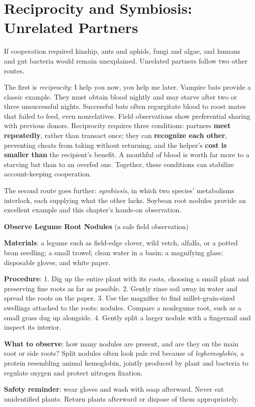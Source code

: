 \section{Reciprocity and Symbiosis: Unrelated Partners}

If cooperation required kinship, ants and aphids, fungi and algae, and humans and gut bacteria would remain unexplained. Unrelated partners follow two other routes.

The first is \emph{reciprocity}: I help you now, you help me later. Vampire bats provide a classic example. They must obtain blood nightly and may starve after two or three unsuccessful nights. Successful bats often regurgitate blood to roost mates that failed to feed, even nonrelatives. Field observations show preferential sharing with previous donors. Reciprocity requires three conditions: partners \textbf{meet repeatedly}, rather than transact once; they can \textbf{recognize each other}, preventing cheats from taking without returning; and the helper's \textbf{cost is smaller than} the recipient's benefit. A mouthful of blood is worth far more to a starving bat than to an overfed one. Together, these conditions can stabilize account-keeping cooperation.

The second route goes further: \emph{symbiosis}, in which two species' metabolisms interlock, each supplying what the other lacks. Soybean root nodules provide an excellent example and this chapter's hands-on observation.

\begin{shiyan}
\textbf{Observe Legume Root Nodules} (a safe field observation)

\textbf{Materials}: a legume such as field-edge clover, wild vetch, alfalfa, or a potted bean seedling; a small trowel; clean water in a basin; a magnifying glass; disposable gloves; and white paper.

\textbf{Procedure}: 1. Dig up the entire plant with its roots, choosing a small plant and preserving fine roots as far as possible. 2. Gently rinse soil away in water and spread the roots on the paper. 3. Use the magnifier to find millet-grain-sized swellings attached to the roots: nodules. Compare a nonlegume root, such as a small grass dug up alongside. 4. Gently split a larger nodule with a fingernail and inspect its interior.

\textbf{What to observe}: how many nodules are present, and are they on the main root or side roots? Split nodules often look pale red because of \emph{leghemoglobin}, a protein resembling animal hemoglobin, jointly produced by plant and bacteria to regulate oxygen and protect nitrogen fixation.

\textbf{Safety reminder}: wear gloves and wash with soap afterward. Never eat unidentified plants. Return plants afterward or dispose of them appropriately.
\end{shiyan}

